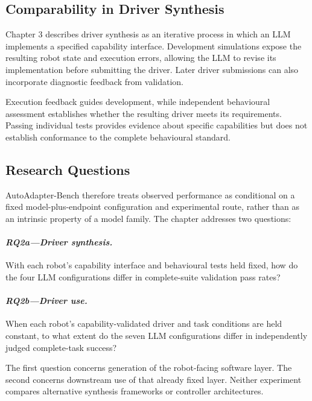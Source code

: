 \subsection[Comparability in Driver Synthesis]{Comparability in Driver Synthesis}

Chapter 3 describes driver synthesis as an iterative process in which an LLM
implements a specified capability interface. Development simulations expose
the resulting robot state and execution errors, allowing the LLM to revise its
implementation before submitting the driver. Later driver submissions can
also incorporate diagnostic feedback from validation.

Execution feedback guides development, while independent behavioural
assessment establishes whether the resulting driver meets its requirements.
Passing individual tests provides evidence about specific capabilities but
does not establish conformance to the complete behavioural standard.

\subsection[Research Questions]{Research Questions}

AutoAdapter-Bench therefore treats observed performance as conditional on a
fixed model-plus-endpoint configuration and experimental route, rather than as
an intrinsic property of a model family. The chapter addresses two questions:

\paragraph{\textit{RQ2a---Driver synthesis.}}
With each robot's capability interface and behavioural tests held fixed,
how do the four LLM configurations differ in complete-suite validation pass rates?

\paragraph{\textit{RQ2b---Driver use.}}
When each robot's capability-validated driver and task conditions are held
constant, to what extent do the seven LLM configurations differ in
independently judged complete-task success?

The first question concerns generation of the robot-facing software layer. The
second concerns downstream use of that already fixed layer. Neither experiment
compares alternative synthesis frameworks or controller architectures.

